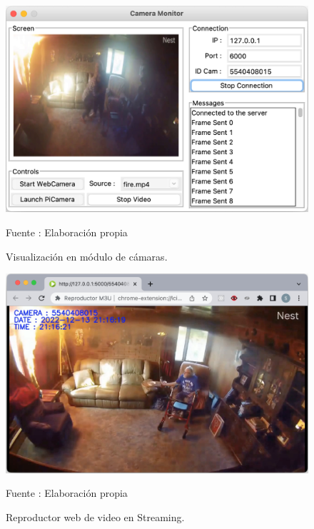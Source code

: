 \begin{figure}[H]
    \begin{center}
        \includegraphics[width=12cm]{img/capitulo_6/stream.png}
    \end{center}
    \begin{center}
        \caption{Visualización en módulo de cámaras.}
        Fuente : Elaboración propia
    \end{center}
\end{figure}

\begin{figure}[H]
    \begin{center}
        \includegraphics[width=15cm]{img/capitulo_6/stream_web.png}
    \end{center}
    \begin{center}
        \caption{Reproductor web de video en Streaming.}
        Fuente : Elaboración propia
    \end{center}
\end{figure}